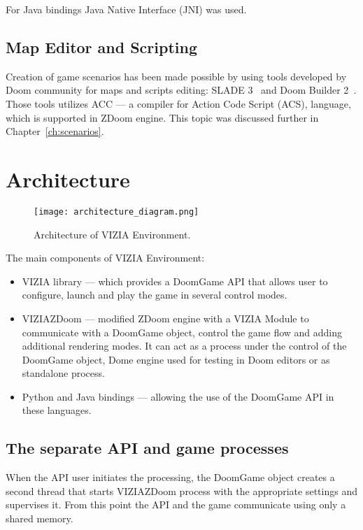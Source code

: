 For Java bindings Java Native Interface (JNI) was used.


\subsection{Map Editor and Scripting}

Creation of game scenarios has been made possible by using tools developed by Doom community for maps and scripts editing: SLADE 3~\cite{slade3} and Doom Builder 2~\cite{db2}. Those tools utilizes ACC --- a compiler for Action Code Script (ACS), language, which is supported in ZDoom engine.
This topic was discussed further in Chapter~\ref{ch:scenarios}.

\section{Architecture}\label{sec:architecture}
	\begin{figure}
			\centering
			\texttt{[image: architecture\_diagram.png]}
			\caption{Architecture of VIZIA Environment.}\label{fig:architecture_diagram}
	\end{figure}

The main components of VIZIA Environment:
    \begin{itemize}
    \item VIZIA library --- which provides a DoomGame API that allows user to configure, launch and play the game in several control modes.
    \item VIZIAZDoom --- modified ZDoom engine with a VIZIA Module to communicate with a DoomGame object, control the game flow and adding additional rendering modes. It can act as a process under the control of the DoomGame object, Dome engine used for testing in Doom editors or as standalone process.
    \item Python and Java bindings --- allowing the use of the DoomGame API in these languages.
    \end{itemize}


\subsection{The separate API and game processes}\label{sec:architecture_separate_processes}

When the API user initiates the processing, the DoomGame object creates a second thread that starts VIZIAZDoom process with the appropriate settings and supervises it. From this point the API and the game communicate using only a shared memory.


